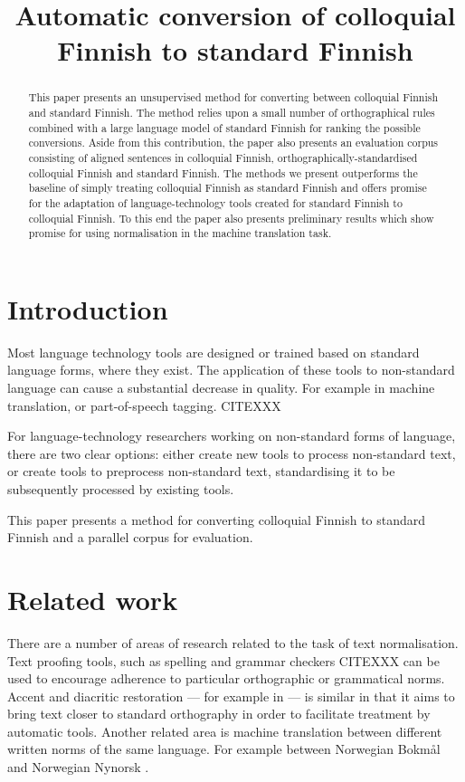 \documentclass[11pt]{article}
\title{Automatic conversion of colloquial Finnish to standard Finnish}
\author{}
\date{}
\begin{document}
\maketitle
\begin{abstract}
  This paper presents an unsupervised method for converting between colloquial Finnish
  and standard Finnish. The method relies upon a small number of orthographical rules
  combined with a large language model of standard Finnish for ranking the possible 
  conversions. Aside from this contribution, the paper also presents an evaluation
  corpus consisting of aligned sentences in colloquial Finnish, orthographically-standardised
  colloquial Finnish and standard Finnish. The methods we present outperforms the baseline
  of simply treating colloquial Finnish as standard Finnish and offers promise for the adaptation
  of language-technology tools created for standard Finnish to colloquial Finnish. To this end
  the paper also presents preliminary results which show promise for using normalisation in 
  the machine translation task.
\end{abstract}

\section{Introduction}

Most language technology tools are designed or trained based on standard language 
forms, where they exist. The application of these tools to non-standard
language can cause a substantial decrease in quality. For example in machine translation,
or part-of-speech tagging. CITEXXX

For language-technology researchers working on non-standard forms of language, there are 
two clear options: either create new tools to process non-standard text,
  or create tools to preprocess non-standard text, standardising it to be subsequently processed
 by existing tools.

This paper presents a method for converting colloquial Finnish to standard Finnish and 
a parallel corpus for evaluation.

\section{Related work}

There are a number of areas of research related to the task of text normalisation. Text
proofing tools, such as spelling and grammar checkers CITEXXX can be used to encourage adherence
to particular orthographic or grammatical norms. Accent and diacritic restoration --- for example in  --- is similar
in that it aims to bring text closer to standard orthography in order to facilitate treatment by 
automatic tools. Another related area is machine translation between different written norms of 
the same language. For example between Norwegian Bokm\aa{}l and Norwegian Nynorsk \cite{unhammer2009}.
\end{document}
